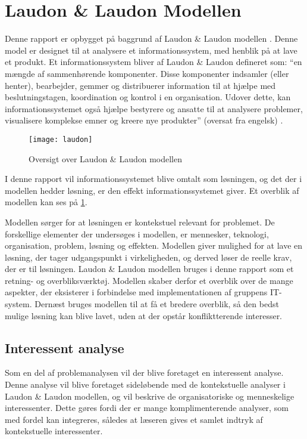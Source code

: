 \section{Laudon \& Laudon Modellen}
Denne rapport er opbygget på baggrund af Laudon \& Laudon modellen \cite{laudon}. Denne model er designet til at analysere et informationssystem, med henblik på at lave et produkt. Et informationssystem bliver af Laudon \& Laudon defineret som: \enquote{en mængde af sammenhørende komponenter. Disse komponenter indsamler (eller henter), bearbejder, gemmer og distribuerer information til at hjælpe med beslutningstagen, koordination og kontrol i en organisation. Udover dette, kan informationssystemet også hjælpe bestyrere og ansatte til at analysere problemer, visualisere komplekse emner og kreere nye produkter} (oversat fra engelsk) \cite{laudon2006management}.

\begin{figure}
  \centering
  \texttt{[image: laudon]}
	\caption{Oversigt over Laudon \& Laudon modellen}
	\label{fig:oversigt_laudon}
\end{figure}

I denne rapport vil informationssystemet blive omtalt som løsningen, og det der i modellen hedder løsning, er den effekt informationssystemet giver. Et overblik af modellen kan ses på \cref{fig:oversigt_laudon}. 

Modellen sørger for at løsningen er kontekstuel relevant for problemet. De forskellige elementer der undersøges i modellen, er mennesker, teknologi, organisation, problem, løsning og effekten. Modellen giver mulighed for at lave en løsning, der tager udgangspunkt i virkeligheden, og derved løser de reelle krav, der er til løsningen. Laudon \& Laudon modellen bruges i denne rapport som et retning- og overbliksværktøj. Modellen skaber derfor et overblik over de mange aspekter, der eksisterer i forbindelse med implementationen af gruppens IT-system. Dernæst bruges modellen til at få et bredere overblik, så den bedst mulige løsning kan blive lavet, uden at der opstår konfliktterende interesser.

\subsection*{Interessent analyse}

Som en del af problemanalysen vil der blive foretaget en interessent analyse. Denne analyse vil blive foretaget sideløbende med de kontekstuelle analyser i Laudon \& Laudon modellen, og vil beskrive de organisatoriske og menneskelige interessenter. Dette gøres fordi der er mange komplimenterende analyser, som med fordel kan integreres, således at læseren gives et samlet indtryk af kontekstuelle interessenter.
